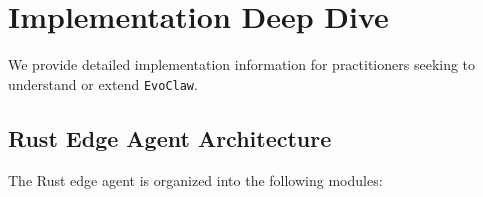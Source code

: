 \documentclass[conference]{IEEEtran}
\newcommand{\evoclaw}{\texttt{EvoClaw}\xspace}
\begin{document}

\section{Implementation Deep Dive}
\label{sec:impl_deep}

We provide detailed implementation information for practitioners seeking to understand or extend \evoclaw{}.

\subsection{Rust Edge Agent Architecture}

The Rust edge agent is organized into the following modules:
\end{document}
